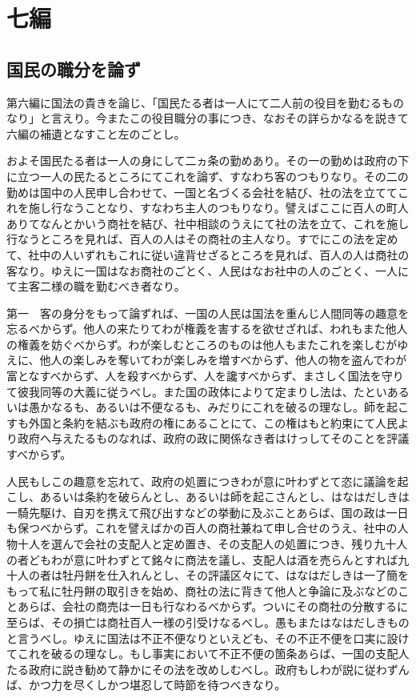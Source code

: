 \documentclass[a4paper, platex, dvipdfmx]{jsarticle}
\begin{document}
\section{七編}
\subsection{国民の職分を論ず}
第六編に国法の貴きを論じ、「国民たる者は一人にて二人前の役目を勤むるものなり」と言えり。今またこの役目職分の事につき、なおその詳らかなるを説きて六編の補遺となすこと左のごとし。

およそ国民たる者は一人の身にして二ヵ条の勤めあり。その一の勤めは政府の下に立つ一人の民たるところにてこれを論ず、すなわち客のつもりなり。その二の勤めは国中の人民申し合わせて、一国と名づくる会社を結び、社の法を立ててこれを施し行なうことなり、すなわち主人のつもりなり。譬えばここに百人の町人ありてなんとかいう商社を結び、社中相談のうえにて社の法を立て、これを施し行なうところを見れば、百人の人はその商社の主人なり。すでにこの法を定めて、社中の人いずれもこれに従い違背せざるところを見れば、百人の人は商社の客なり。ゆえに一国はなお商社のごとく、人民はなお社中の人のごとく、一人にて主客二様の職を勤むべき者なり。

第一　客の身分をもって論ずれば、一国の人民は国法を重んじ人間同等の趣意を忘るべからず。他人の来たりてわが権義を害するを欲せざれば、われもまた他人の権義を妨ぐべからず。わが楽しむところのものは他人もまたこれを楽しむがゆえに、他人の楽しみを奪いてわが楽しみを増すべからず、他人の物を盗んでわが富となすべからず、人を殺すべからず、人を讒すべからず、まさしく国法を守りて彼我同等の大義に従うべし。また国の政体によりて定まりし法は、たといあるいは愚かなるも、あるいは不便なるも、みだりにこれを破るの理なし。師を起こすも外国と条約を結ぶも政府の権にあることにて、この権はもと約束にて人民より政府へ与えたるものなれば、政府の政に関係なき者はけっしてそのことを評議すべからず。

人民もしこの趣意を忘れて、政府の処置につきわが意に叶わずとて恣に議論を起こし、あるいは条約を破らんとし、あるいは師を起こさんとし、はなはだしきは一騎先駆け、自刃を携えて飛び出すなどの挙動に及ぶことあらば、国の政は一日も保つべからず。これを譬えばかの百人の商社兼ねて申し合せのうえ、社中の人物十人を選んで会社の支配人と定め置き、その支配人の処置につき、残り九十人の者どもわが意に叶わずとて銘々に商法を議し、支配人は酒を売らんとすれば九十人の者は牡丹餅を仕入れんとし、その評議区々にて、はなはだしきは一了簡をもって私に牡丹餅の取引きを始め、商社の法に背きて他人と争論に及ぶなどのことあらば、会社の商売は一日も行なわるべからず。ついにその商社の分散するに至らば、その損亡は商社百人一様の引受けなるべし。愚もまたはなはだしきものと言うべし。ゆえに国法は不正不便なりといえども、その不正不便を口実に設けてこれを破るの理なし。もし事実において不正不便の箇条あらば、一国の支配人たる政府に説き勧めて静かにその法を改めしむべし。政府もしわが説に従わずんば、かつ力を尽くしかつ堪忍して時節を待つべきなり。
\end{document}
